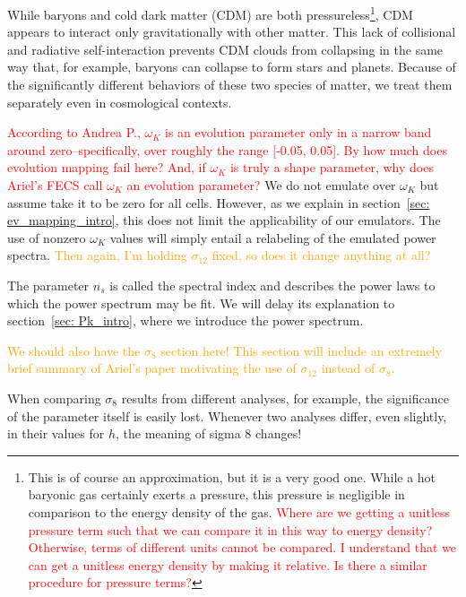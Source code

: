
While baryons and cold dark matter (CDM) are both pressureless\footnote{This 
is of
course an approximation, but it is a very good one. While a hot baryonic gas 
certainly exerts a pressure, this pressure is negligible in comparison to the energy density of the gas. \textcolor{red}{Where are we getting a unitless
pressure term such that we can compare it in this way to energy density?
Otherwise, terms of different units cannot be compared. I understand that we
can get a unitless energy density by making it relative. Is there a similar
procedure for pressure terms?}}, CDM appears to interact only gravitationally
with other matter. This lack of collisional and radiative self-interaction
prevents CDM clouds from collapsing in the same way that, for example,
baryons can collapse to form stars and planets. Because of the significantly
different behaviors of these two species of matter, we treat them separately
even in cosmological contexts.


\textcolor{red}{According to Andrea P., $\omega_K$ is an evolution parameter 
only in a narrow 
band around zero--specifically, over roughly the range [-0.05, 0.05].
By how much does evolution mapping fail here? And, if 
$\omega_K$ is truly a shape parameter, why does Ariel's FECS call $\omega_K$
an evolution parameter?} We do not emulate over $\omega_K$ but assume take
it to be zero for all cells. However, as we explain in
section~\ref{sec: ev_mapping_intro}, this does not limit the applicability of
our emulators. The use of nonzero $\omega_K$ values will simply entail a
relabeling of the emulated power spectra. \textcolor{orange}{Then again, I'm
holding $\sigma_{12}$ fixed, so does it change anything at all?}


The parameter $n_s$ is called the spectral index and describes the power laws
to which the power spectrum may be fit. We will delay its explanation to
section~\ref{sec: Pk_intro}, where we introduce the power spectrum.


\textcolor{orange}{We should also have the $\sigma_8$ section here! This 
section will include an extremely brief summary of Ariel's paper motivating 
the use of $\sigma_{12}$ instead of $\sigma_8$.}

When comparing $\sigma_8$ results from different analyses, for example, the significance of the parameter itself is easily lost. Whenever two analyses differ, even slightly, in their values for $h$, the meaning of sigma 8 changes!

